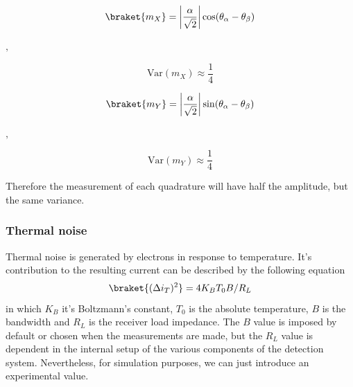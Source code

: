 %
\begin{center}
	\begin{minipage}{58mm}
		\noindent
		\begin{equation}
			\braket{m_X} = \left|\frac{\alpha}{\sqrt{2}}\right| \cos({\theta_\alpha - \theta_\beta})
		\end{equation}
	\end{minipage}
	$,\quad$
	\begin{minipage}{37mm}
		\noindent
		\begin{equation}
			\textrm{Var}(m_X) \approx \frac{1}{4}
		\end{equation}
	\end{minipage}
\end{center}
%
%
\begin{center}
	\begin{minipage}{58mm}
		\noindent
		\begin{equation}
			\braket{m_Y} =  \left|\frac{\alpha}{\sqrt{2}}\right| \sin({\theta_\alpha - \theta_\beta})
		\end{equation}
	\end{minipage}
	$,\quad$
	\begin{minipage}{37mm}
		\noindent
		\begin{equation}
			\textrm{Var}(m_Y) \approx \frac{1}{4}
		\end{equation}
	\end{minipage}
\end{center}
%
Therefore the measurement of each quadrature will have half the amplitude, but the same variance.
%
%
%
\subsubsection{Thermal noise}
Thermal noise is generated by electrons in response to temperature. It's contribution to the resulting current can be described by the following equation
\cite{fox2006}
%
\begin{equation}
\braket{(\Delta i_T)^2} = 4 K_B T_0 B/R_L
\end{equation}
%
in which $K_B$ it's Boltzmann's constant, $T_0$ is the absolute temperature, $B$ is the bandwidth and $R_L$ is the receiver load impedance. The $B$ value is imposed by default or chosen when the measurements are made, but the $R_L$ value is dependent in the internal setup of the various components of the detection system. Nevertheless, for simulation purposes, we can just introduce an experimental value.\\
\vspace{1cm}
%
%
